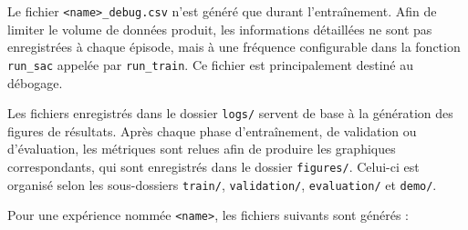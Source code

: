 \begin{tcolorbox}[colback=YellowGreen!5,colframe=YellowGreen,title=Remarque]
    Le fichier \texttt{<name>\_debug.csv} n'est généré que durant l'entraînement. Afin de limiter le volume de données produit, les informations détaillées ne sont pas enregistrées à chaque épisode, mais à une fréquence configurable dans la fonction \texttt{run\_sac} appelée par \texttt{run\_train}. Ce fichier est principalement destiné au débogage.
\end{tcolorbox}

\noindent Les fichiers enregistrés dans le dossier \texttt{logs/} servent de base à la génération des figures de résultats. Après chaque phase d'entraînement, de validation ou d'évaluation, les métriques sont relues afin de produire les graphiques correspondants, qui sont enregistrés dans le dossier \texttt{figures/}. Celui-ci est organisé selon les sous-dossiers \texttt{train/}, \texttt{validation/}, \texttt{evaluation/} et \texttt{demo/}.

\vspace{10pt}

\noindent Pour une expérience nommée \texttt{<name>}, les fichiers suivants sont générés :

